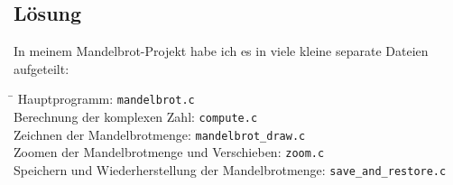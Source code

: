 \documentclass[ngerman,12pt,a4paper,titlepage]{article}
\begin{document}
\subsection{Lösung}
\begin{sloppypar}
In meinem Mandelbrot-Projekt habe ich es in viele kleine separate Dateien aufgeteilt: 
 	
\begin{tabbing}
\hspace{25em}\=\kill
Hauptprogramm: \> \texttt{mandelbrot.c}\\
 		
Berechnung der komplexen Zahl: \> \texttt{compute.c}\\
 		
Zeichnen der Mandelbrotmenge: \> \texttt{mandelbrot\_draw.c}\\
 		
Zoomen der Mandelbrotmenge und Verschieben: \> \texttt{zoom.c}\\
 		
Speichern und Wiederherstellung der Mandelbrotmenge: \> \texttt{save\_and\_restore.c}\\
 		
\end{tabbing}

\end{sloppypar}
\end{document}
